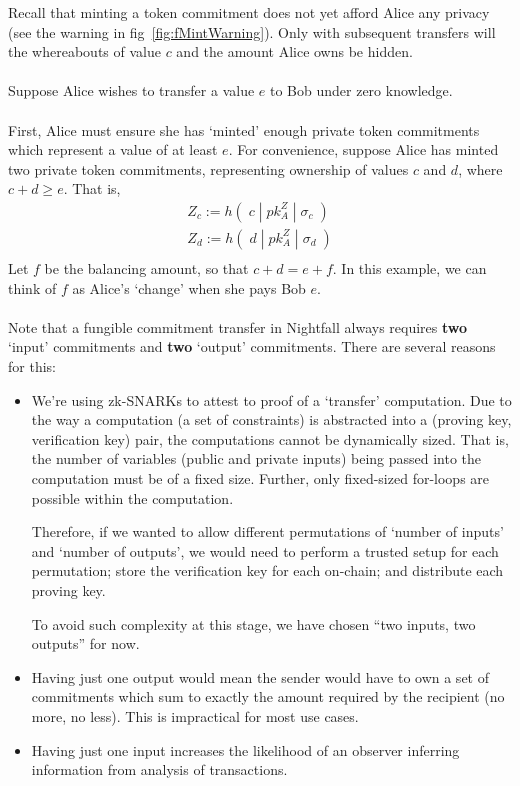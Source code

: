 \documentclass{article}
\begin{document}
\noindent
Recall that minting a token commitment does not yet afford Alice any privacy (see the warning in fig~\ref{fig:fMintWarning}). Only with subsequent transfers will the whereabouts of value $c$ and the amount Alice owns be hidden.\\
\\



Suppose Alice wishes to transfer a value $e$ to Bob under zero knowledge.\\
\\
First, Alice must ensure she has `minted' enough private token commitments which represent a value of at least $e$.
For convenience, suppose Alice has minted two private token commitments, representing ownership of values $c$ and $d$, where $c+d \geq e$. That is,
\begin{align*}
  Z_c := h(\;c\;|\;pk^Z_A\;|\;\sigma_c\;)\\
  Z_d := h(\;d\;|\;pk^Z_A\;|\;\sigma_d\;)\\
\end{align*}
Let $f$ be the balancing amount, so that $c+d = e+f$. In this example, we can think of $f$ as Alice's `change' when she pays Bob $e$.\\
\\
Note that a fungible commitment transfer in Nightfall always requires \textbf{two} `input' commitments and \textbf{two} `output' commitments. There are several reasons for this:
\begin{itemize}
  \item We're using zk-SNARKs to attest to proof of a `transfer' computation. Due to the way a computation (a set of constraints) is abstracted into a (proving key, verification key) pair, the computations cannot be dynamically sized. That is, the number of variables (public and private inputs) being passed into the computation must be of a fixed size. Further, only fixed-sized for-loops are possible within the computation.

  Therefore, if we wanted to allow different permutations of `number of inputs' and `number of outputs', we would need to perform a trusted setup for each permutation; store the verification key for each on-chain; and distribute each proving key.

  To avoid such complexity at this stage, we have chosen ``two inputs, two outputs'' for now.

  \item Having just one output would mean the sender would have to own a set of commitments which sum to exactly the amount required by the recipient (no more, no less). This is impractical for most use cases.
  \item Having just one input increases the likelihood of an observer inferring information from analysis of transactions.
\end{itemize}
\ \\
\end{document}
